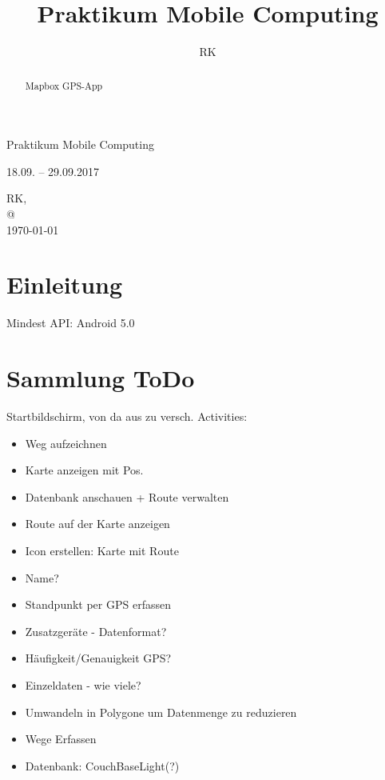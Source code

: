 \documentclass[a4paper, 10pt]{scrartcl}
\title{Praktikum Mobile Computing}
\author{RK}		%
\begin{document}
\begin{titlepage}
   
   \begin{center}
   \vspace*{4cm}
      \huge{Praktikum Mobile Computing}\\
      \vspace{1cm}
      
      \Large{18.09. – 29.09.2017}
      
      \vfill
      \Large{RK, }\\		%
      \large{@}\\	%
      \vspace{1cm}
      \today
      
      \vspace*{2cm}
      
      
   \end{center}
   
\end{titlepage}

\tableofcontents

\newpage

\begin{abstract}
Mapbox GPS-App
\end{abstract}

\newpage

\section{Einleitung}

Mindest API: Android 5.0 

\section{Sammlung ToDo}

Startbildschirm, von da aus zu versch. Activities:
\begin{itemize}
\item Weg aufzeichnen
\item Karte anzeigen mit Pos.
\item Datenbank anschauen + Route verwalten
\item Route auf der Karte anzeigen
\end{itemize}

\begin{itemize}
 \item Icon erstellen: Karte mit Route
\item Name?
\item Standpunkt per GPS erfassen
\item Zusatzgeräte - Datenformat?
\item Häufigkeit/Genauigkeit GPS?
\item Einzeldaten - wie viele?
\item Umwandeln in Polygone um Datenmenge zu reduzieren
\item Wege Erfassen
\item Datenbank: CouchBaseLight(?)
\end{itemize}
\end{document}
